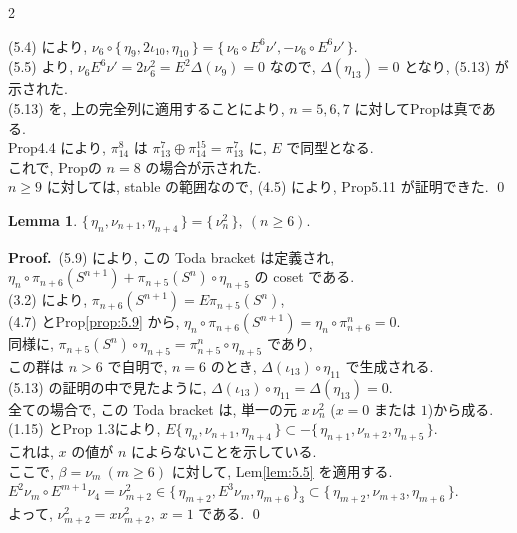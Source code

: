 \documentclass[10pt, leqno]{ltjsarticle}
\newcommand{\toda}[1]{\{\,#1\,\}}              %
\newcommand{\todai}[2][]{\{\,#2\,\}_{#1}}      %
\newcommand{\gen}[1]{\{\,#1\,\}}       %
\newcommand{\pis}[2]{\pi_{#1}(#2)}       %
\numberwithin{equation}{section}
\theoremstyle{plain}
\newtheorem{lemma}[theorem]{Lemma}
\theoremstyle{definition}
\theoremstyle{remark}
\begin{document}
\begin{paracol}{2}

(5.4) により, 
\(\nu_6\circ\gen{\eta_9,2\iota_{10},\eta_{10}}
=\gen{\nu_6\circ E^6\nu', -\nu_6\circ E^6\nu'} .\)\\
(5.5) より, 
\(\nu_6 E^6\nu'=2\nu_6^2=E^2\Delta(\nu_9)=0\)
なので, \(\Delta(\eta_{13})=0\) となり, (5.13) が示された. \\
(5.13) を, 上の完全列に適用することにより, \(n=5,6,7\) に対してPropは真である. \\
Prop4.4 により, 
\(\pi_{14}^8\) は 
\(\pi_{13}^7\oplus\pi_{14}^{15}=\pi_{13}^7\)
に, \(E\) で同型となる. \\
これで, Propの \(n=8\) の場合が示された. \\
\(n\geq9\) に対しては, stable の範囲なので, (4.5) により, 
Prop5.11 が証明できた. 
\qed

\begin{lemma}\label{lemma:5.12}
\(\toda{\eta_n,\nu_{n+1},\eta_{n+4}} = \gen{\nu_n^2},\ (n\geq6) .\)
\end{lemma}

\noindent
\textbf{Proof.}\ 
(5.9) により, この Toda bracket は定義され, \\
\(\eta_n\circ \pi_{n+6}(S^{n+1})+\pi_{n+5}(S^{n})\circ \eta_{n+5}\) 
の coset である. \\
(3.2) により, \(\pi_{n+6}(S^{n+1})=E\pi_{n+5}(S^{n})\), \\
(4.7) とProp\ref{prop:5.9} から, 
\(\eta_n\circ \pi_{n+6}(S^{n+1})=\eta_n\circ \pi^{n}_{n+6}=0 .\)\\
同様に,
\(\pis{n+5}{S^n}\circ \eta_{n+5}=\pi_{n+5}^n\circ\eta_{n+5}\)
であり, \\
この群は \(n>6\) で自明で, 
\(n=6\) のとき, \(\Delta(\iota_{13})\circ\eta_{11}\) で生成される. \\
(5.13) の証明の中で見たように, \(\Delta(\iota_{13})\circ\eta_{11}=\Delta(\eta_{13})=0 .\)\\
全ての場合で, この Toda bracket は, 単一の元
\(x\,\nu_n^{2}\) (\(x=0\) または \(1\))から成る. \\
(1.15) とProp 1.3により, 
\(
E\toda{\eta_n,\nu_{n+1},\eta_{n+4}}
\subset -\toda{\eta_{n+1},\nu_{n+2},\eta_{n+5}} .
\)\\
これは, \(x\) の値が \(n\) によらないことを示している. \\
ここで, \(\beta=\nu_m \ (m\geq6)\) に対して, Lem\ref{lem:5.5} を適用する. \\
\(
E^{2}\nu_m\circ E^{m+1}\nu_4
=\nu_{m+2}^{2}
\in \todai[3]{\eta_{m+2},E^3\nu_{m},\eta_{m+6}}
\subset \toda{\eta_{m+2},\nu_{m+3},\eta_{m+6}} .
\)\\
よって, \(\nu_{m+2}^2=x\nu_{m+2}^2,\ x=1\) である. 
\qed


\end{paracol}
\end{document}
